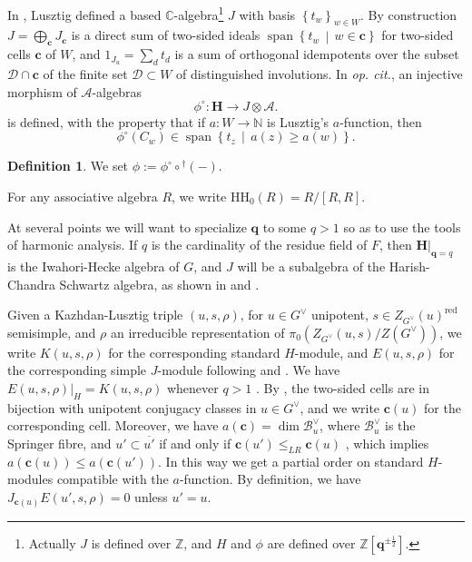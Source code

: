 \documentclass[10pt]{article}
\DeclareMathOperator{\spn}{span}
\newcommand{\sets}[2]{\left\{#1\,\middle|\,#2\right\}}
\newcommand{\sett}[1]{\left\{#1\right\}}
\newcommand{\HH}{\mathbf{H}}
\newcommand{\N}{\mathbb{N}}
\newcommand{\Z}{\mathbb{Z}}
\newcommand{\C}{\mathbb{C}}
\newcommand{\cc}{\mathbf{c}}
\newcommand{\bq}{\mathbf{q}}
\theoremstyle{definition}
\newtheorem{dfn}{Definition}
\theoremstyle{remark}
\newcommand{\Gd}{G^\vee}
\newcommand{\hhh}{\mathrm{HH}_0}
\newcommand{\Zur}{Z_{G^\vee}(u)^{\mathrm{red}}}
\begin{document}
In \cite{cellsII}, Lusztig defined a based $\C$-algebra\footnote[1]{Actually $J$ is defined over $\Z$, and $H$ and $\phi$ are defined over 
$\Z\left[\bq^{\pm\frac{1}{2}}\right]$.}
$J$ with basis $\sett{t_w}_{w\in W}$. 
By construction $J=\bigoplus_\cc J_\cc$ is a direct sum of two-sided ideals $\spn\sets{t_w}{w\in\cc}$
for two-sided cells $\cc$ of $W$, and $1_{J_u}=\sum_{d}t_d$ is a sum of
orthogonal idempotents over the subset $\mathcal{D}\cap\cc$ of the finite
set $\mathcal{D}\subset W$ of distinguished involutions. In \textit{op. cit.}, an injective morphism of $\mathcal{A}$-algebras
%
\[
\phi^\circ\colon\HH\to J\otimes\mathcal{A}.
\]
%
is defined, with the property that 
if $a\colon W\to\N$ is Lusztig's $a$-function, then
%
\begin{equation}
\label{eqn phi upper-triangular}
\phi^\circ(C_w)\in\spn{\sets{t_z}{a(z)\geq a(w)}}.
\end{equation}
%
%
\begin{dfn}
We set $\phi:=\phi^\circ\circ{}^\dagger(-)$.
\end{dfn}
%
For any associative algebra $R$, we write $\hhh(R)=R/[R,R]$.

At several points we will want to specialize
$\bq$ to some $q>1$ so as to use the tools of harmonic 
analysis. If $q$ is the cardinality of the residue field of $F$, then $\HH|_{\bq=q}$ is the Iwahori-Hecke algebra of $G$,
and $J$ will be a subalgebra of the Harish-Chandra Schwartz algebra, as 
shown in \cite{BK} and \cite{Plancherel}.

Given a Kazhdan-Lusztig triple $(u,s,\rho)$, for $u\in G^\vee$  
unipotent, $s\in\Zur$ semisimple, and $\rho$ an irreducible representation of 
$\pi_0(Z_{G^\vee}(u,s)/Z(\Gd))$, we write $K(u,s,\rho)$ for the corresponding standard
$H$-module, and $E(u,s,\rho)$ for the corresponding simple $J$-module following
\cite{KLDeligneLanglands} and \cite{cellsIV}. We have 
$E(u,s,\rho)|_H=K(u,s,\rho)$ whenever $q>1$ \cite{BK}.
By \cite{cellsIV}, the two-sided cells
are in bijection with unipotent conjugacy classes in $u\in G^\vee$, and 
we write $\cc(u)$ for the corresponding cell. Moreover, we
have $a(\cc)=\dim\mathcal{B}^\vee_u$, where $\mathcal{B}^\vee_u$ is 
the Springer fibre, and $u'\subset\overline{u'}$ if and only if
$\cc(u')\leq_{LR}\cc(u)$ \cite{BezPerv}, which implies $a(\cc(u))\leq a(\cc(u'))$. In this way we get a partial order on standard $H$-modules
compatible with the $a$-function. By definition, we have $J_{\cc(u)}E(u',s,\rho)=0$ unless $u'=u$.
%
\end{document}
